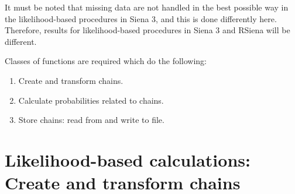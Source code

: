 \documentclass[a4paper,12pt,fleqn]{article}
\begin{document}
It must be noted that missing data are not handled in the best possible way
in the likelihood-based procedures in Siena 3, and this
is done differently here.
Therefore, results for likelihood-based procedures in Siena 3 and RSiena
will be different.

Classes of functions are required which do the following:
\begin{enumerate}
\item Create and transform chains.
\item Calculate probabilities related to chains.
\item Store chains: read from and write to file.
\end{enumerate}

\section{Likelihood-based calculations:
         \protect\newline Create and transform chains}
\end{document}
